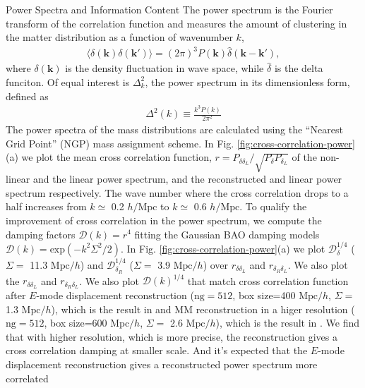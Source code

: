 \begin{section}{Power Spectra and Information Content}
  \label{sec:fisherinfo}
    The power spectrum is the Fourier transform of the correlation function and measures
 the amount of clustering in the matter distribution as a function of wavenumber $k$,
\begin{align}
    \langle \delta \left( \bm{k} \right) \delta \left( \bm{k'}\right) \rangle =
\left( 2\pi \right) ^3 P \left( \bm{k} \right) \hat{\delta} \left( \bm{k}-\bm{k'} \right),
\end{align}
where $\delta \left( \bm{k} \right)$ is the density fluctuation in wave space, while 
$\hat{\delta}$ is the delta funciton. Of equal interest is $\Delta ^2_k$, the power 
spectrum in its dimensionless form, defined as
\begin{align}
    \Delta ^2(k) \equiv \frac{k^3 P \left( k \right)}{2\pi ^2}
\end{align}
    The power spectra of the mass distributions are calculated using the \enquote{Nearest Grid Point} 
(NGP) mass assignment scheme. In Fig. \ref{fig:cross-correlation-power}(a) we plot the mean cross correlation 
function, $r=P_{\delta \delta_L}/\sqrt{P_\delta P_{\delta_L}}$ of the non-linear and the 
linear power spectrum, and the reconstructed and 
linear power spectrum respectively. The wave number where the cross correlation drops to a half increases 
from $k\simeq$ 0.2 $h/\mathrm{Mpc}$ to $k \simeq$ 0.6 $h/\mathrm{Mpc}$. 
To qualify the improvement of cross correlation in the 
power spectrum, we compute the damping factors $\mathcal{D}(k)=r^4$ fitting the Gaussian BAO damping models 
$\mathcal{D}(k)=\mathrm{exp}(-k^2 \Sigma^2/2)$. In Fig. \ref{fig:cross-correlation-power}(a) 
we plot $\mathcal{D}_\delta^{1/4}$ ($\Sigma =$ 11.3 $\mathrm{Mpc}/h$) and $\mathcal{D}_{\delta_R}^{1/4}$ 
($\Sigma = $ 3.9 $\mathrm{Mpc}/h$) over $r_{\delta\delta_L}$ and $r_{\delta_R\delta_L}$. 
We also plot the $r_{\delta\delta_L}$ and $r_{\delta_R\delta_L}$. We also plot $\mathcal{D}(k)^{1/4}$ 
that match cross correlation function after $E$-mode displacement 
reconstruction ($\mathrm{ng}=512$, box size=400 $\mathrm{Mpc}/h$, $\Sigma =$ 1.3 $\mathrm{Mpc}/h$), 
which is the result in \cite{bib:Yu2016} and 
MM reconstruction in a higer resolution ($\mathrm{ng}=512$, box size=600 $\mathrm{Mpc}/h$, $\Sigma =$ 2.6 $\mathrm{Mpc}/h$), 
which is the result in \cite{bib:ZhuH2016}. We find that with higher resolution, which is more precise, 
the reconstruction gives a cross correlation damping at smaller scale. 
And it's expected that the $E$-mode displacement reconstruction gives a reconstructed power spectrum more correlated 

\end{section}
